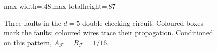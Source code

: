 \begin{figure}[tp]\centering
\begin{adjustbox}{max width=.48\textwidth,max totalheight=.87\textheight}

\end{adjustbox}
\caption{Three faults in the $d=5$ double-checking circuit.
Coloured boxes mark the faults; coloured wires trace their propagation.
Conditioned on this pattern, $A_{\mathcal F}=B_{\mathcal F}=1/16$.}
\label{fig:d5-fixed-faults}
\end{figure}
\FloatBarrier

